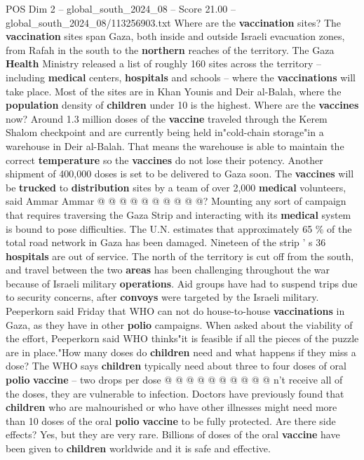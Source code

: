 \begin{textsample}{POS Dim 2 – global\_south\_2024\_08 – Score 21.00 – global\_south\_2024\_08/113256903.txt}
Where are the \textbf{vaccination} sites?
The \textbf{vaccination} sites span Gaza, both inside and outside Israeli evacuation zones, from Rafah in the south to the \textbf{northern} reaches of the territory.
The Gaza \textbf{Health} Ministry released a list of roughly 160 sites across the territory -- including \textbf{medical} centers, \textbf{hospitals} and schools -- where the \textbf{vaccinations} will take place.
Most of the sites are in Khan Younis and Deir al-Balah, where the \textbf{population} density of \textbf{children} under 10 is the highest.
Where are the \textbf{vaccines} now?
Around 1.3 million doses of the \textbf{vaccine} traveled through the Kerem Shalom checkpoint and are currently being held in"cold-chain storage"in a warehouse in Deir al-Balah.
That means the warehouse is able to maintain the correct \textbf{temperature} so the \textbf{vaccines} do not lose their potency.
Another shipment of 400,000 doses is set to be delivered to Gaza soon.
The \textbf{vaccines} will be \textbf{trucked} to \textbf{distribution} sites by a team of over 2,000 \textbf{medical} volunteers, said Ammar Ammar @ @ @ @ @ @ @ @ @ @?
Mounting any sort of campaign that requires traversing the Gaza Strip and interacting with its \textbf{medical} system is bound to pose difficulties.
The U.N. estimates that approximately 65 \% of the total road network in Gaza has been damaged.
Nineteen of the strip ' s 36 \textbf{hospitals} are out of service.
The north of the territory is cut off from the south, and travel between the two \textbf{areas} has been challenging throughout the war because of Israeli military \textbf{operations}.
Aid groups have had to suspend trips due to security concerns, after \textbf{convoys} were targeted by the Israeli military.
Peeperkorn said Friday that WHO can not do house-to-house \textbf{vaccinations} in Gaza, as they have in other \textbf{polio} campaigns.
When asked about the viability of the effort, Peeperkorn said WHO thinks"it is feasible if all the pieces of the puzzle are in place."How many doses do \textbf{children} need and what happens if they miss a dose?
The WHO says \textbf{children} typically need about three to four doses of oral \textbf{polio} \textbf{vaccine} -- two drops per dose @ @ @ @ @ @ @ @ @ @ n't receive all of the doses, they are vulnerable to infection.
Doctors have previously found that \textbf{children} who are malnourished or who have other illnesses might need more than 10 doses of the oral \textbf{polio} \textbf{vaccine} to be fully protected.
Are there side effects?
Yes, but they are very rare.
Billions of doses of the oral \textbf{vaccine} have been given to \textbf{children} worldwide and it is safe and effective.

\end{textsample}
